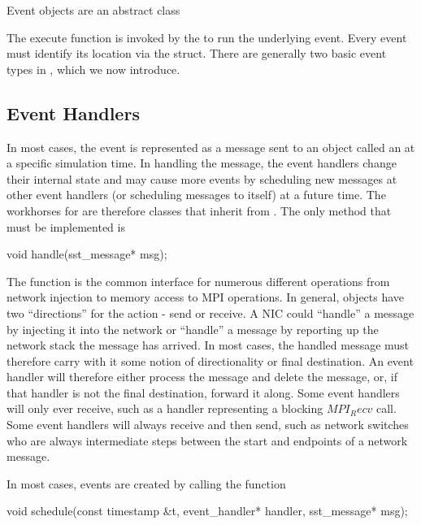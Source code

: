 Event objects are an abstract class

\begin{CppCode}
namespace sstmac {

class event
{
 public:
  virtual void
  execute() = 0;

  virtual event_loc_id
  event_location() const = 0;
};
\end{CppCode}

The execute function is invoked by the \evmgr to run the underlying event.
Every event must identify its location via the  struct.
There are generally two basic event types in \sstmacro, which we now introduce.

\subsection{Event Handlers}
In most cases, the event is represented as a message sent to an object called an \evhandler at a specific simulation time.
In handling the message, the event handlers change their internal state and may cause more events
by scheduling new messages at other event handlers (or scheduling messages to itself) at a future time.
The workhorses for \sstmacro are therefore classes that inherit from \evhandler.
The only method that must be implemented is

\begin{CppCode}
void
handle(sst_message* msg);
\end{CppCode}
The function is the common interface for numerous different operations from network injection to memory access to MPI operations.
In general, objects have two ``directions'' for the action - send or receive.
A NIC could ``handle'' a message by injecting it into the network or ``handle'' a message by reporting up the network stack the message has arrived.
In most cases, the handled message must therefore carry with it some notion of directionality or final destination.
An event handler will therefore either process the message and delete the message, or, if that handler is not the final destination, forward it along.
Some event handlers will only ever receive, such as a handler representing a blocking $MPI_Recv$ call.
Some event handlers will always receive and then send, such as network switches who are always intermediate steps between the start and endpoints of a network message.

In most cases, events are created by calling the function

\begin{CppCode}
void
schedule(const timestamp &t,
  event_handler* handler,
  sst_message* msg);
\end{CppCode}

